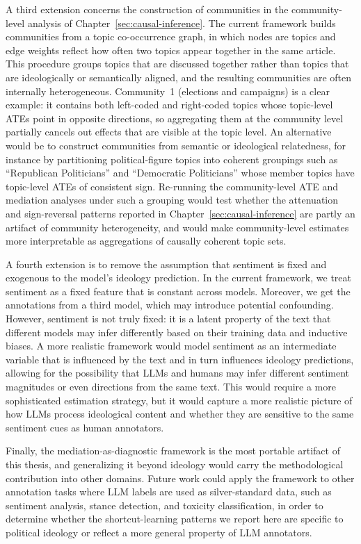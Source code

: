 A third extension concerns the construction of communities in the community-level analysis of Chapter~\ref{sec:causal-inference}. The current framework builds communities from a topic co-occurrence graph, in which nodes are topics and edge weights reflect how often two topics appear together in the same article. This procedure groups topics that are discussed together rather than topics that are ideologically or semantically aligned, and the resulting communities are often internally heterogeneous. Community~1 (elections and campaigns) is a clear example: it contains both left-coded and right-coded topics whose topic-level ATEs point in opposite directions, so aggregating them at the community level partially cancels out effects that are visible at the topic level. An alternative would be to construct communities from semantic or ideological relatedness, for instance by partitioning political-figure topics into coherent groupings such as ``Republican Politicians'' and ``Democratic Politicians'' whose member topics have topic-level ATEs of consistent sign. Re-running the community-level ATE and mediation analyses under such a grouping would test whether the attenuation and sign-reversal patterns reported in Chapter~\ref{sec:causal-inference} are partly an artifact of community heterogeneity, and would make community-level estimates more interpretable as aggregations of causally coherent topic sets.

A fourth extension is to remove the assumption that sentiment is fixed and exogenous to the model's ideology prediction. In the current framework, we treat sentiment as a fixed feature that is constant across models. Moreover, we get the annotations from a third model, which may introduce potential confounding. However, sentiment is not truly fixed: it is a latent property of the text that different models may infer differently based on their training data and inductive biases. A more realistic framework would model sentiment as an intermediate variable that is influenced by the text and in turn influences ideology predictions, allowing for the possibility that LLMs and humans may infer different sentiment magnitudes or even directions from the same text. This would require a more sophisticated estimation strategy, but it would capture a more realistic picture of how LLMs process ideological content and whether they are sensitive to the same sentiment cues as human annotators.

Finally, the mediation-as-diagnostic framework is the most portable artifact of this thesis, and generalizing it beyond ideology would carry the methodological contribution into other domains. Future work could apply the framework to other annotation tasks where LLM labels are used as silver-standard data, such as sentiment analysis, stance detection, and toxicity classification, in order to determine whether the shortcut-learning patterns we report here are specific to political ideology or reflect a more general property of LLM annotators.


